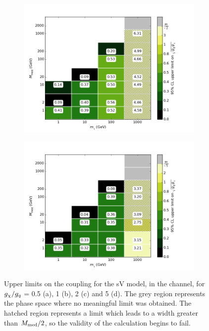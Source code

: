 \begin{figure}[t]
\begin{subfigure}[t]{0.45\textwidth}
      \includegraphics[width=1.\textwidth]{figures/grid_basepoints_SVD_rat2_monojet.png}
      \caption{}
    \end{subfigure}
    \begin{subfigure}[t]{0.45\textwidth}
      \centering
      \includegraphics[width=1.\textwidth]{figures/grid_basepoints_SVD_rat5_monojet.png}
      \caption{}
    \end{subfigure}
    \caption{Upper limits on the coupling for the sV model, in the \monojet channel, for $g_{\chi} / g_q$ = 0.5 (a), 1 (b), 2 (c) and 5 (d). The grey region represents the phase space where no meaningful limit was obtained. The hatched region represents a limit which leads to a width greater than $M_{\mathrm{med}} / 2$, so the validity of the calculation begins to fail.}
    \label{fig:Monojet_SVD_couplinglimit}
\end{figure}

